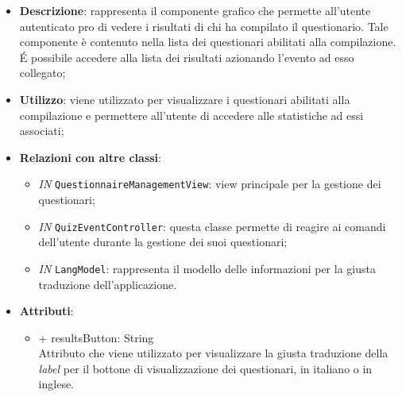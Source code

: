 \begin{itemize}
	\item \textbf{Descrizione}: rappresenta il componente grafico che permette all'utente autenticato pro di vedere i risultati di chi ha compilato il questionario. Tale componente è contenuto nella lista dei questionari abilitati alla compilazione. \'E possibile accedere alla lista dei risultati azionando l'evento ad esso collegato;
	\item \textbf{Utilizzo}: viene utilizzato per visualizzare i questionari abilitati alla compilazione e permettere all'utente di accedere alle statistiche ad essi associati;
	\item \textbf{Relazioni con altre classi}: 
	\begin{itemize}
		\item \textit{IN} \texttt{QuestionnaireManagementView}: view principale per la gestione dei questionari; 
		\item \textit{IN} \texttt{QuizEventController}: questa classe permette di reagire ai comandi dell'utente durante la gestione dei suoi questionari;
		\item \textit{IN} \texttt{LangModel}: rappresenta il modello delle informazioni per la giusta traduzione dell'applicazione.
	\end{itemize}
	\item \textbf{Attributi}: 
	\begin{itemize}
		\item {+ resultsButton: String} \\ Attributo che viene utilizzato per visualizzare la giusta traduzione della \textit{label} per il bottone di visualizzazione dei questionari, in italiano o in inglese.
	\end{itemize} 
\end{itemize}
